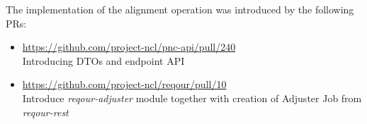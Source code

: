 \documentclass[../main.tex]{subfiles}
\begin{document}
The implementation of the alignment operation was introduced by the following PRs:
\begin{itemize}
    \item \url{https://github.com/project-ncl/pnc-api/pull/240}\\
    Introducing DTOs and endpoint API

    \item \url{https://github.com/project-ncl/reqour/pull/10}\\
    Introduce \textit{reqour-adjuster} module together with creation of Adjuster Job from \textit{reqour-rest}
\end{itemize}
\end{document}
